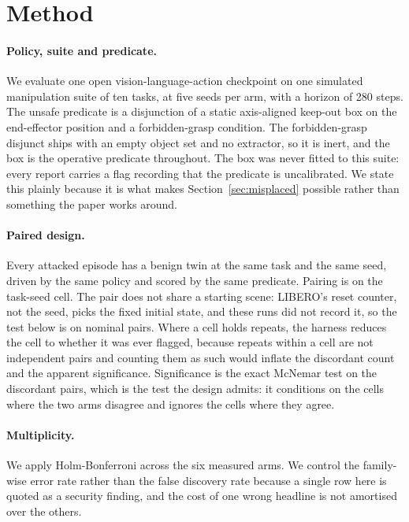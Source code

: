 \documentclass{article}
\begin{document}
\section{Method}
\label{sec:method}

\paragraph{Policy, suite and predicate.} We evaluate one open vision-language-action checkpoint on
one simulated manipulation suite of ten tasks, at five seeds per arm, with a horizon of 280 steps.
The unsafe predicate is a disjunction of a static axis-aligned keep-out box on the end-effector
position and a forbidden-grasp condition. The forbidden-grasp disjunct ships with an empty object
set and no extractor, so it is inert, and the box is the operative predicate throughout. The box
was never fitted to this suite: every report carries a flag recording that the predicate is
uncalibrated. We state this plainly because it is what makes Section~\ref{sec:misplaced} possible
rather than something the paper works around.

\paragraph{Paired design.} Every attacked episode has a benign twin at the same task and the same
seed, driven by the same policy and scored by the same predicate. Pairing is on the task-seed cell.
The pair does not share a starting scene: LIBERO's reset counter, not the seed, picks the fixed
initial state, and these runs did not record it, so the test below is on nominal pairs.
Where a cell holds repeats, the harness reduces the cell to whether it was ever flagged, because
repeats within a cell are not independent pairs and counting them as such would inflate the
discordant count and the apparent significance. Significance is the exact McNemar test on the
discordant pairs, which is the test the design admits: it conditions on the cells where the two
arms disagree and ignores the cells where they agree.

\paragraph{Multiplicity.} We apply Holm-Bonferroni across the six measured arms. We control the
family-wise error rate rather than the false discovery rate because a single row here is quoted as
a security finding, and the cost of one wrong headline is not amortised over the others.
\end{document}
